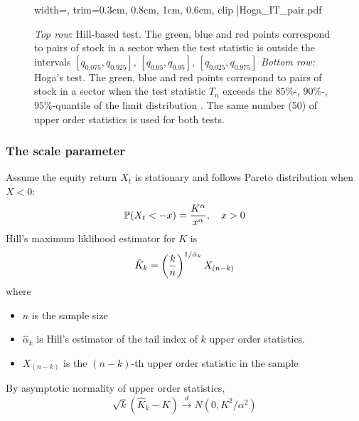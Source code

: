 \documentclass{beamer}
\begin{document}
\begin{frame}
\begin{figure}[htb!]
\begin{minipage}{0.33\linewidth}
      width=\textwidth,
      trim={0.3cm, 0.8cm, 1cm, 0.6cm}, clip
    ]{Hoga_IT_pair.pdf}
  \end{minipage}
  \caption{\tiny
    {\em Top row}: Hill-based test.
    The green, blue and red points correspond to pairs of stock in a sector
    when the test statistic is outside the intervals $[q_{0.075},q_{0.925}]$,
    $[q_{0.05},q_{0.95}]$,  $[q_{0.025},q_{0.975}]$
    {\em Bottom row:} Hoga's test.
    The green, blue and red points correspond to pairs of stock in a sector 
    when the test statistic $T_n$ exceeds the $85\%$-, $90\%$-,
    $95\%$-quantile of the limit distribution .
    The same number (50) of upper order statistics is used for both tests.}
  \label{fig:PairTest} 
\end{figure}
\end{frame}

\begin{frame}
  \frametitle{The scale parameter}
  Assume the equity return $X_t$ is stationary and follows Pareto
  distribution when $X < 0$:
  \[
  \P(X_t < -x) = {
    K^\alpha
    \over
    x^\alpha
  }, \quad x > 0
  \]
  Hill's \cite{hill1975simple} maximum liklihood estimator for $K$ is
  \[
  \hat K_k = \left(
  {k \over n}
  \right)^{1/\hat \alpha_k} X_{(n - k)}
  \]
  where
  \begin{itemize}
  \item $n$ is the sample size
  \item $\hat \alpha_k$ is Hill's estimator of the tail index of $k$
    upper order statistics.
  \item $X_{(n - k)}$ is the $(n-k)$-th upper order statistic in the sample
  \end{itemize}
  By asymptotic normality of upper order statistics,
  \[
  \sqrt k (\hat K_k - K) \overset{d}{\to} N(0, K^2/\alpha^2)
  \]
\end{frame}
\end{document}
